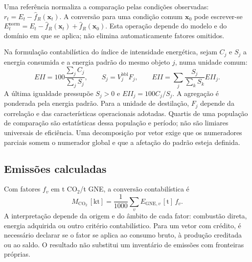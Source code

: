 Uma referência normaliza a comparação pelas condições observadas: $r_t=E_t-\widehat f_R(\boldsymbol x_t)$. A conversão para uma condição comum $\boldsymbol x_0$ pode escrever-se $E_t^{\mathrm{norm}}=E_t-\widehat f_R(\boldsymbol x_t)+\widehat f_R(\boldsymbol x_0)$. Esta operação depende do modelo e do domínio em que se aplica; não elimina automaticamente fatores omitidos.

Na formulação contabilística do índice de intensidade energética, sejam $C_j$ e $S_j$ a energia consumida e a energia padrão do mesmo objeto $j$, numa unidade comum:
\begin{equation}
EII=100\frac{\sum_jC_j}{\sum_jS_j},
\qquad S_j=V_j^{\mathrm{bbl}}F_j,
\qquad EII=\sum_j\frac{S_j}{\sum_kS_k}EII_j.
\label{eq:mat-eii}
\end{equation}
A última igualdade pressupõe $S_j>0$ e $EII_j=100C_j/S_j$. A agregação é ponderada pela energia padrão. Para a unidade de destilação, $F_j$ depende da correlação e das características operacionais adotadas. Quartis de uma população de comparação são estatísticas dessa população e período; não são limiares universais de eficiência. Uma decomposição por vetor exige que os numeradores parciais somem o numerador global e que a afetação do padrão esteja definida.


\subsection{Emissões calculadas}
\label{sec:mat-emissoes}
Com fatores $f_v$ em t CO$_2$/t GNE, a conversão contabilística é
\begin{equation}
M_{\mathrm{CO_2}}\,[\mathrm{kt}]=\frac1{1000}\sum_v E_{\mathrm{GNE},v}\,[\mathrm{t}]\,f_v.
\label{eq:mat-emissoes}
\end{equation}
A interpretação depende da origem e do âmbito de cada fator: combustão direta, energia adquirida ou outro critério contabilístico. Para um vetor com crédito, é necessário declarar se o fator se aplica ao consumo bruto, à produção creditada ou ao saldo. O resultado não substitui um inventário de emissões com fronteiras próprias.

